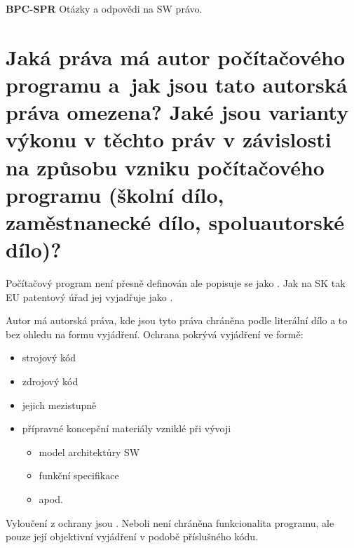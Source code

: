 \documentclass[12pt,a4paper,czech]{article}
\let\LaTeXStandardTableOfContents\tableofcontents
\renewcommand{\tableofcontents}{%
\begingroup%
\renewcommand{\bfseries}{\relax}%
\LaTeXStandardTableOfContents%
\endgroup%
}%
\newcommand{\nadpis}[1]{{\section{#1}}}
\newcommand{\nadpisM}[1]{\noindent\textbf{\Huge{#1}}\normalsize}
\begin{document}
\clearpage
\vspace*{\fill}
\begin{center}
\begin{minipage}{.6\textwidth}
\begin{center}
\vspace{0.5cm} \nadpisM{BPC-SPR}\newline
\newline
Otázky a odpovědi na SW právo.
\end{center}
\end{minipage}
\end{center}
\vfill %
\clearpage



\newpage
\tableofcontents
\newpage

\vspace{0.5cm} 
\nadpis{Jaká práva má autor počítačového programu a~jak jsou tato autorská práva omezena? Jaké jsou varianty výkonu v těchto práv v závislosti na způsobu vzniku počítačového programu (školní dílo, zaměstnanecké dílo, spoluautorské dílo)?}

Počítačový program není přesně definován ale popisuje se jako . Jak na SK tak EU patentový úřad jej vyjadřuje jako .

Autor má autorská práva, kde jsou tyto práva chráněna podle literální dílo a to bez ohledu na formu vyjádření.\vspace{0.5cm}\newline
Ochrana pokrývá vyjádření ve formě:
\begin{itemize}
    \setlength\itemsep{0em}
    \item strojový kód
    \item zdrojový kód
    \item jejich mezistupně
    \item přípravné koncepční materiály vzniklé při vývoji
    \begin{itemize}
        \setlength\itemsep{0em}
        \item model architektůry SW
        \item funkční specifikace
        \item apod.
    \end{itemize}
\end{itemize}
Vyloučení z ochrany jsou . Neboli není chráněna funkcionalita programu, ale pouze její objektivní vyjádření v podobě příslušného kódu.
\end{document}
